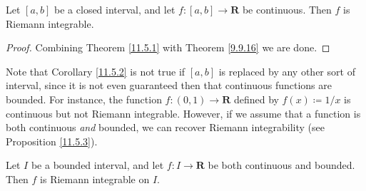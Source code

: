 \begin{corollary}\label{11.5.2}
    Let \([a, b]\) be a closed interval, and let \(f : [a, b] \to \mathbf{R}\) be continuous.
    Then \(f\) is Riemann integrable.
\end{corollary}

\begin{proof}
    Combining Theorem \ref{11.5.1} with Theorem \ref{9.9.16} we are done.
\end{proof}

\begin{note}
    Note that Corollary \ref{11.5.2} is not true if \([a, b]\) is replaced by any other sort of interval, since it is not even guaranteed then that continuous functions are bounded.
    For instance, the function \(f : (0, 1) \to \mathbf{R}\) defined by \(f(x) \coloneqq 1 / x\) is continuous but not Riemann integrable.
    However, if we assume that a function is both continuous \emph{and} bounded, we can recover Riemann integrability (see Proposition \ref{11.5.3}).
\end{note}

\begin{proposition}\label{11.5.3}
    Let \(I\) be a bounded interval, and let \(f : I \to \mathbf{R}\) be both continuous and bounded.
    Then \(f\) is Riemann integrable on \(I\).
\end{proposition}

